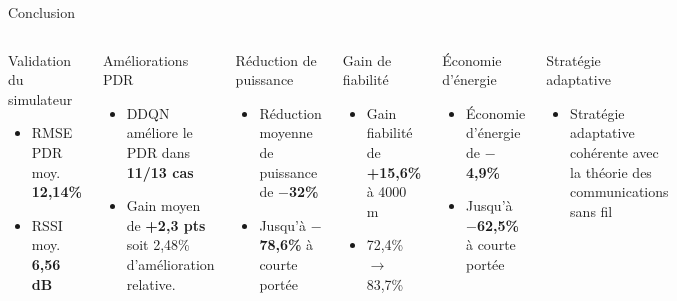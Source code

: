 \documentclass[aspectratio=169, 11pt]{beamer}
\begin{document}
	
	\begin{frame}{Conclusion}
		
		\begin{columns}[T]
			\begin{block}{Validation du simulateur}
				\begin{itemize}
					\item RMSE PDR moy. \textbf{12,14\%}
					\item RSSI moy. \textbf{6,56 dB}
				\end{itemize}
			\end{block}
			\vspace{0.2em}
			\begin{block}{Améliorations PDR}
				\begin{itemize}
					\item DDQN améliore le PDR dans \textbf{11/13 cas}
					\item Gain moyen de \textbf{+2,3 pts} soit 2,48\% d’amélioration relative. 
				\end{itemize}
			\end{block}
			\vspace{0.2em}
			\begin{block}{Réduction de puissance}
				\begin{itemize}
					\item Réduction moyenne de puissance de \textbf{$-$32\%}
					\item Jusqu'à \textbf{$-$78,6\%} à courte portée
				\end{itemize}
			\end{block}
			
			\begin{exampleblock}{Gain de fiabilité}
				\begin{itemize}
					\item Gain fiabilité de \textbf{+15,6\%} à 4000 m
					\item 72,4\% $\to$ 83,7\%
				\end{itemize}
			\end{exampleblock}
			\vspace{0.2em}
			\begin{exampleblock}{Économie d'énergie}
				\begin{itemize}
					\item Économie d'énergie de \textbf{$-$4,9\%}
					\item Jusqu'à \textbf{$-$62,5\%} à courte portée
				\end{itemize}
			\end{exampleblock}
			\vspace{0.2em}
			\begin{exampleblock}{Stratégie adaptative}
				\begin{itemize}
					\item Stratégie adaptative cohérente avec la théorie des communications sans fil
				\end{itemize}
			\end{exampleblock}
		\end{columns}

		
	\end{frame}
	
\end{document}
